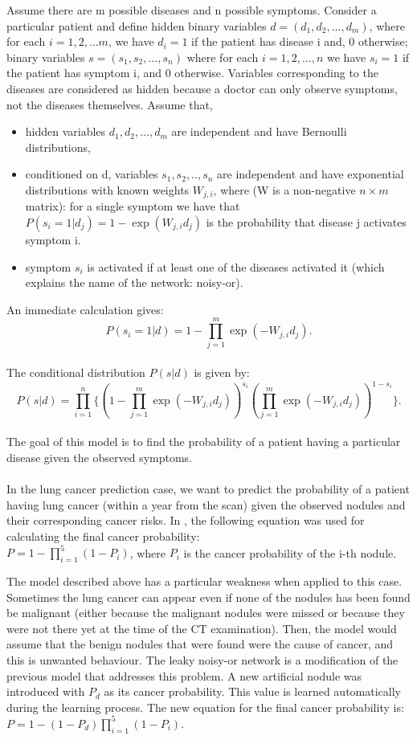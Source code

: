 \documentclass[12pt]{article}
\begin{document}
Assume there are m possible diseases and n possible symptoms. Consider a particular patient and define hidden binary variables $d=(d_1, d_2, \ldots, d_m)$, where for each $i=1, 2, \ldots m$, we have $d_i = 1$ if the patient has disease i and, 0 otherwise; binary variables $s=(s_1, s_2,\ldots, s_n)$ where for each $i=1, 2, \ldots ,n$ we have $s_i = 1$ if the patient has symptom i, and 0 otherwise. Variables corresponding to the diseases are considered as hidden because a doctor can only observe symptoms, not the diseases themselves. Assume that,
\begin{itemize}
\item  hidden variables $d_1, d_2, \ldots, d_m$ are independent and have Bernoulli distributions,
\item  conditioned on d, variables $s_1, s_2,.., s_n$ are independent and have exponential distributions with known weights $W_{j,i}$, where (W is a non-negative $n \times m$ matrix): for a single symptom we have that $P(s_i=1|d_j)= 1 - \exp(W_{j,i}d_j)$ is the probability that disease j activates symptom i.
\item symptom $s_i$ is activated if at least one of the diseases activated it (which explains the name of the network: noisy-or).
\end{itemize}
An immediate calculation gives: $$P(s_i=1|d) = 1- {\displaystyle \prod_{j=1}^{m} \exp(-W_{j,i}d_j)}.$$ 
\\The conditional distribution $P(s|d)$ is given by:
$$P(s|d) = {\displaystyle \prod_{i=1}^{n} \{(1 - \prod_{j=1}^{m} \exp(-W_{j,i}d_j))^{s_i}(\prod_{j=1}^{m} \exp(-W_{j,i}d_j))^{1-s_i}\}}.$$
\\The goal of this model is to find the probability of a patient having a particular disease given the observed symptoms. 
\\\\In the lung cancer prediction case, we want to predict the probability of a patient having lung cancer (within a year from the scan) given the observed nodules and their corresponding cancer risks. In \citep{liao2017evaluate}, the following equation was used for calculating the final cancer probability:
\\$P = 1 - {\displaystyle \prod_{i=1}^{5} (1-P_i)}$, where $P_i$ is the cancer probability of the i-th nodule.

The model described above has a particular weakness when applied to this case. Sometimes the lung cancer can appear even if none of the nodules has been found be malignant (either because the malignant nodules were missed or because they were not there yet at the time of the CT examination). Then, the model would assume that the benign nodules that were found were the cause of cancer, and this is unwanted behaviour. The leaky noisy-or network is a modification of the previous model that addresses this problem. A new artificial nodule was introduced with $P_d$ as its cancer probability. This value is learned automatically during the learning process.  The new equation for the final cancer probability is: \\$P = 1 - (1-P_d){\displaystyle \prod_{i=1}^{5} (1-P_i)}.$
\end{document}
